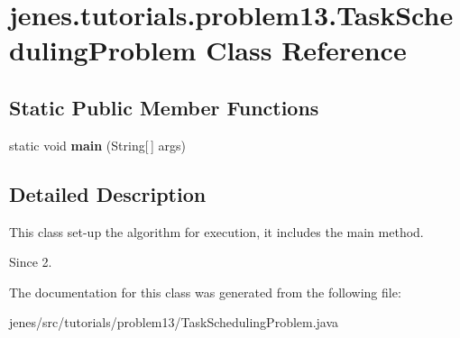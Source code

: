 \hypertarget{classjenes_1_1tutorials_1_1problem13_1_1_task_scheduling_problem}{\section{jenes.\-tutorials.\-problem13.\-Task\-Scheduling\-Problem Class Reference}
\label{classjenes_1_1tutorials_1_1problem13_1_1_task_scheduling_problem}
}
\subsection*{Static Public Member Functions}
\begin{DoxyCompactItemize}
\item 
\hypertarget{classjenes_1_1tutorials_1_1problem13_1_1_task_scheduling_problem_a8c491000b5a0ceb63e81c5aa645915a8}{static void {\bfseries main} (String\mbox{[}$\,$\mbox{]} args)}\label{classjenes_1_1tutorials_1_1problem13_1_1_task_scheduling_problem_a8c491000b5a0ceb63e81c5aa645915a8}

\end{DoxyCompactItemize}


\subsection{Detailed Description}
This class set-\/up the algorithm for execution, it includes the main method.

\begin{DoxySince}{Since}
2. 
\end{DoxySince}


The documentation for this class was generated from the following file\-:\begin{DoxyCompactItemize}
\item 
jenes/src/tutorials/problem13/Task\-Scheduling\-Problem.\-java\end{DoxyCompactItemize}
